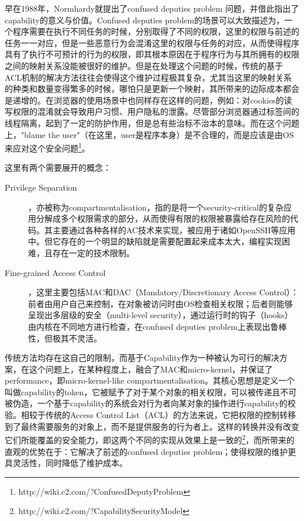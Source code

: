 \documentclass[final,12pt]{elsarticle}
\begin{document}
早在1988年，Normhardy就提出了confused deputies problem \cite{deputies} 问题，并借此指出了capability的意义与价值。Confused deputies problem的场景可以大致描述为，一个程序需要在执行不同任务的时候，分别取得了不同的权限，这里的权限与前述的任务一一对应，但是一些恶意行为会混淆这里的权限与任务的对应，从而使得程序具有了执行不可预计的行为的权限，即其根本原因在于程序行为与其所拥有的权限之间的映射关系没能被很好的维护。但是在处理这个问题的时候，传统的基于ACL机制的解决方法往往会使得这个维护过程极其复杂，尤其当这里的映射关系的种类和数量变得繁多的时候，哪怕只是更新一个映射，其所带来的边际成本都会是递增的。在浏览器的使用场景中也同样存在这样的问题，例如：对cookies的读写权限的混淆就会导致用户习惯、用户隐私的泄露。尽管部分浏览器通过标签间的线程隔离，起到了一定的防护作用\cite{capsicum}，但是总有些治标不治本的意味。而在这个问题上，"blame the user"（在这里，user是程序本身）是不合理的，而是应该是由OS来应对这个安全问题\footnote{http://wiki.c2.com/?ConfusedDeputyProblem}。

这里有两个需要展开的概念：
\begin{description}
\item[Privilege Separation]，亦被称为compartmentalisation，指的是将一个security-critical的复杂应用分解成多个权限需求的部分，从而使得有限的权限被暴露给存在风险的代码。其主要通过各种各样的AC技术来实现，被应用于诸如OpenSSH等应用中。但它存在的一个明显的缺陷就是需要配置起来成本太大，编程实现困难，且存在一定的技术限制。

\item[Fine-grained Access Control]，这里主要包括MAC和DAC（Mandatory/Discretionary Access Control）：前者由用户自己来控制，在对象被访问时由OS检查相关权限；后者则能够呈现出多层级的安全（multi-level security），通过运行时的钩子（hooks）由内核在不同地方进行检查，在confused deputies problem上表现出鲁棒性，但极其不灵活。
\end{description}

传统方法均存在这自己的限制，而基于Capability作为一种被认为可行的解决方案，在这个问题上，在某种程度上，融合了MAC和micro-kernel，并保证了performance，即micro-kernel-like compartmentalisation。其核心思想是定义一个叫做capability的token，它被赋予了对于某个对象的相关权限，可以被传递且不可被伪造，一个基于capability的系统会对行为者向某对象的操作进行capability的校验。相较于传统的Access Control List（ACL）的方法来说，它把权限的控制转移到了最终需要服务的对象上，而不是提供服务的行为者上。这样的转换并没有改变它们所能覆盖的安全能力，即这两个不同的实现从效果上是一致的\footnote{http://wiki.c2.com/?CapabilitySecurityModel}，而所带来的直观的优势在于：它解决了前述的confused deputies problem；使得权限的维护更具灵活性，同时降低了维护成本。
\end{document}
